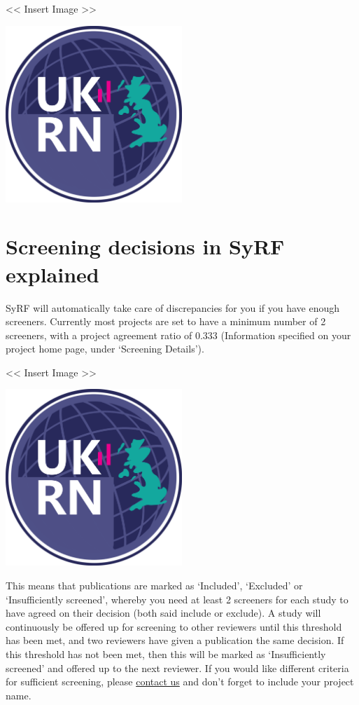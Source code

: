 \documentclass[
]{book}
\begin{document}
\textless{}\textless{} Insert Image \textgreater{}\textgreater{}

\includegraphics[width=0.5\textwidth,height=0.5\textheight]{figs/evidence-triangle.png}

\hypertarget{screening-decisions-in-syrf-explained}{%
\section{Screening decisions in SyRF explained}\label{screening-decisions-in-syrf-explained}}

SyRF will automatically take care of discrepancies for you if you have enough screeners. Currently most projects are set to have a minimum number of 2 screeners, with a project agreement ratio of 0.333 (Information specified on your project home page, under `Screening Details').

\textless{}\textless{} Insert Image \textgreater{}\textgreater{}

\includegraphics[width=0.5\textwidth,height=0.5\textheight]{figs/evidence-triangle.png}

This means that publications are marked as `Included', `Excluded' or `Insufficiently screened', whereby you need at least 2 screeners for each study to have agreed on their decision (both said include or exclude). A study will continuously be offered up for screening to other reviewers until this threshold has been met, and two reviewers have given a publication the same decision. If this threshold has not been met, then this will be marked as `Insufficiently screened' and offered up to the next reviewer.
If you would like different criteria for sufficient screening, please \href{mailtp:syrf.info@ed.ac.uk?subject=Screening\%20Criteria\%20in\%20SyRF}{contact us} and don't forget to include your project name.
\end{document}
